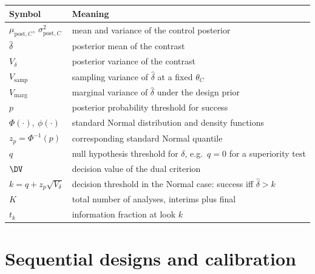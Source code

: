 \begin{tabularx}{\linewidth}{@{}lX@{}}
\toprule
Symbol & Meaning \\
\midrule
$\mu_{\text{post},C},\ \sigma_{\text{post},C}^2$ & mean and variance of the control posterior \\
$\hat\delta$                                 & posterior mean of the contrast \\
$V_\delta$                                   & posterior variance of the contrast \\
$V_{\text{samp}}$                            & sampling variance of $\hat\delta$ at a fixed $\theta_C$ \\
$V_{\text{marg}}$                            & marginal variance of $\hat\delta$ under the design prior \\
$p$                                          & posterior probability threshold for success \\
$\Phi(\cdot),\ \phi(\cdot)$                  & standard Normal distribution and density functions \\
$z_p = \Phi^{-1}(p)$                         & corresponding standard Normal quantile \\
$q$                                          & null hypothesis threshold for $\delta$, e.g.\ $q=0$ for a superiority test \\
$\DV$                                        & decision value of the dual criterion \\
$k = q + z_p\sqrt{V_\delta}$                 & decision threshold in the Normal case: success iff $\hat\delta > k$ \\
$K$                                          & total number of analyses, interims plus final \\
$t_k$                                        & information fraction at look $k$ \\
\bottomrule
\end{tabularx}

\section*{Sequential designs and calibration}

